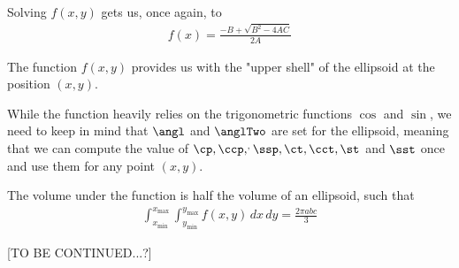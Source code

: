 Solving $f(x, y)$ gets us, once again, to 
\begin{align}
    \label{eq:ellipsoid_final-ellipsoid}
    f(x) = \frac{-B + \sqrt{B^2 - 4 A C}}{2 A}
\end{align}

The function $f(x, y)$ provides us with the "upper shell" of the ellipsoid at the position $(x, y)$.

While the function heavily relies on the trigonometric functions $\cos$ and $\sin$, we need to keep in mind that $\angl$ and $\anglTwo$ are set for the ellipsoid, meaning that we can compute the value of $\cp, \ccp, \sp, \ssp, \ct, \cct, \st$ and $\sst$ once and use them for any point $(x, y)$.


The volume under the function is half the volume of an ellipsoid, such that 
\begin{align}
    \int_{x_{\text{min}}}^{x_{\text{max}}} \int_{y_{\text{min}}}^{y_{\text{max}}} f(x, y) \,dx \,dy = \frac{2 \pi a b c}{3}
\end{align}

[TO BE CONTINUED...?]

